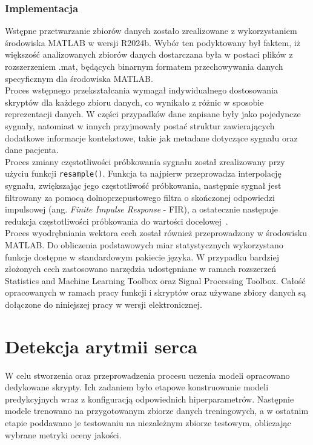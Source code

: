 \documentclass[a4paper,twoside,12pt]{book}
\newcommand{\obcy}[1]{\emph{#1}}
\newcommand{\english}[1]{{\selectlanguage{british}\obcy{#1}}}
\begin{document}
\subsection*{Implementacja}
Wstępne przetwarzanie zbiorów danych zostało zrealizowane z wykorzystaniem środowiska MATLAB w wersji R2024b. Wybór ten podyktowany był faktem, iż większość analizowanych zbiorów danych dostarczana była w postaci plików z rozszerzeniem .mat, będących binarnym formatem przechowywania danych specyficznym dla środowiska MATLAB.\\

Proces wstępnego przekształcania wymagał indywidualnego dostosowania skryptów dla każdego zbioru danych, co wynikało z różnic w sposobie reprezentacji danych. W części przypadków dane zapisane były jako pojedyncze sygnały, natomiast w innych przyjmowały postać struktur zawierających dodatkowe informacje kontekstowe, takie jak metadane dotyczące sygnału oraz dane pacjenta.\\

Proces zmiany częstotliwości próbkowania sygnału został zrealizowany przy użyciu funkcji \texttt{resample()}. Funkcja ta najpierw przeprowadza interpolację sygnału, zwiększając jego częstotliwość próbkowania, następnie sygnał jest filtrowany za pomocą dolnoprzepustowego filtra o skończonej odpowiedzi impulsowej (ang. \english{Finite Impulse Response} - FIR), a ostatecznie następuje redukcja częstotliwości próbkowania do wartości docelowej~\cite{mathworks_resample_2025}.\\


Proces wyodrębniania wektora cech został również przeprowadzony w środowisku MATLAB. Do obliczenia podstawowych miar statystycznych wykorzystano funkcje dostępne w standardowym pakiecie języka. W przypadku bardziej złożonych cech zastosowano narzędzia udostępniane w ramach rozszerzeń Statistics and Machine Learning Toolbox oraz Signal Processing Toolbox. Całość opracowanych w ramach pracy funkcji i skryptów oraz używane zbiory danych są dołączone do niniejszej pracy w wersji elektronicznej.


\chapter{Detekcja arytmii serca}

W celu stworzenia oraz przeprowadzenia procesu uczenia modeli opracowano dedykowane skrypty. Ich zadaniem było etapowe konstruowanie modeli predykcyjnych wraz z konfiguracją odpowiednich hiperparametrów. Następnie modele trenowano na przygotowanym zbiorze danych treningowych, a w ostatnim etapie poddawano je testowaniu na niezależnym zbiorze testowym, obliczając wybrane metryki oceny jakości.\\
\end{document}
